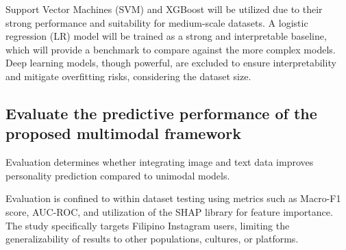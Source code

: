 	Support Vector Machines (SVM) and XGBoost will be utilized due to their strong performance and suitability for medium-scale datasets. A logistic regression (LR) model will be trained as a strong and interpretable baseline, which will provide a benchmark to compare against the more complex models. Deep learning models, though powerful, are excluded to ensure interpretability and mitigate overfitting risks, considering the dataset size.
	
	\subsection{Evaluate the predictive performance of the proposed multimodal framework}
	
	Evaluation determines whether integrating image and text data improves personality prediction compared to unimodal models.
	
	Evaluation is confined to within dataset testing using metrics such as Macro-F1 score, AUC-ROC, and utilization of the SHAP library for feature importance. The study specifically targets Filipino Instagram users, limiting the generalizability of results to other populations, cultures, or platforms.
	





